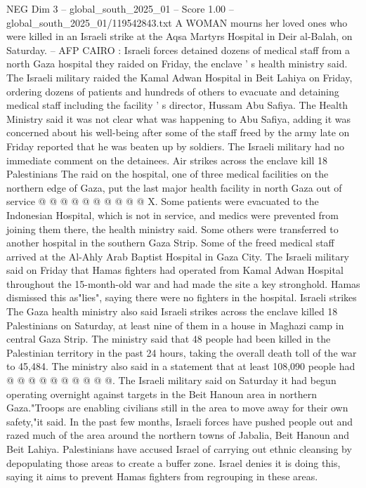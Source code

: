 \begin{textsample}{NEG Dim 3 – global\_south\_2025\_01 – Score 1.00 – global\_south\_2025\_01/119542843.txt}  \label{ex:f3_neg_078}
A WOMAN mourns her loved ones who were killed in an Israeli strike at the Aqsa Martyrs Hospital in Deir al-Balah, on Saturday. -- AFP CAIRO : Israeli forces detained dozens of medical staff from a north Gaza hospital they raided on Friday, the enclave ' s health ministry said.
The Israeli military raided the Kamal Adwan Hospital in Beit Lahiya on Friday, ordering dozens of patients and hundreds of others to evacuate and detaining medical staff including the facility ' s director, Hussam Abu Safiya.
The Health Ministry said it was not clear what was happening to Abu Safiya, adding it was concerned about his well-being after some of the staff freed by the army late on Friday reported that he was beaten up by soldiers.
The Israeli military had no immediate comment on the detainees.
Air strikes across the enclave kill 18 Palestinians The raid on the hospital, one of three medical facilities on the northern edge of Gaza, put the last major health facility in north Gaza out of service @ @ @ @ @ @ @ @ @ @ X.
Some patients were evacuated to the Indonesian Hospital, which is not in service, and medics were prevented from joining them there, the health ministry said.
Some others were transferred to another hospital in the southern Gaza Strip.
Some of the freed medical staff arrived at the Al-Ahly Arab Baptist Hospital in Gaza City.
The Israeli military said on Friday that Hamas fighters had operated from Kamal Adwan Hospital throughout the 15-month-old war and had made the site a key stronghold.
Hamas dismissed this as"lies", saying there were no fighters in the hospital.
Israeli strikes The Gaza health ministry also said Israeli strikes across the enclave killed 18 Palestinians on Saturday, at least nine of them in a house in Maghazi camp in central Gaza Strip.
The ministry said that 48 people had been killed in the Palestinian territory in the past 24 hours, taking the overall death toll of the war to 45,484.
The ministry also said in a statement that at least 108,090 people had @ @ @ @ @ @ @ @ @ @.
The Israeli military said on Saturday it had begun operating overnight against targets in the Beit Hanoun area in northern Gaza."Troops are enabling civilians still in the area to move away for their own safety,"it said.
In the past few months, Israeli forces have pushed people out and razed much of the area around the northern towns of Jabalia, Beit Hanoun and Beit Lahiya.
Palestinians have accused Israel of carrying out ethnic cleansing by depopulating those areas to create a buffer zone.
Israel denies it is doing this, saying it aims to prevent Hamas fighters from regrouping in these areas.

\end{textsample}
